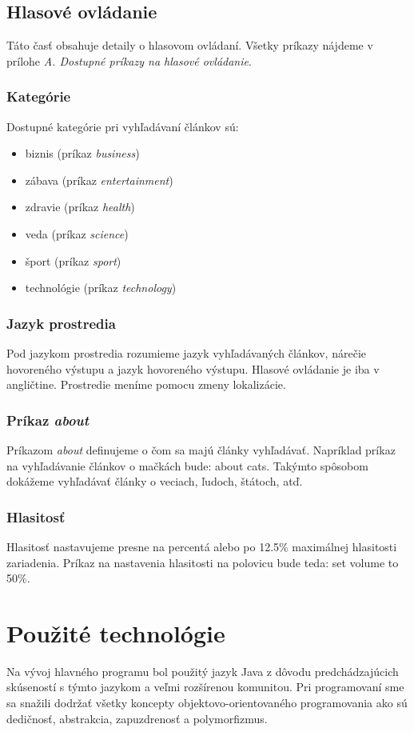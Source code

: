 \documentclass{template/socthesis}
\begin{document}
\subsection*{Hlasové ovládanie}
Táto časť obsahuje detaily o hlasovom ovládaní. Všetky príkazy nájdeme v prílohe \textit{A. Dostupné príkazy na hlasové ovládanie}.

\subsubsection{Kategórie}
Dostupné kategórie pri vyhľadávaní článkov sú:
\begin{itemize}
	\item biznis (príkaz \textit{business})
	\item zábava (príkaz \textit{entertainment})
	\item zdravie (príkaz \textit{health})
	\item veda (príkaz \textit{science})
	\item šport (príkaz \textit{sport})
	\item technológie (príkaz \textit{technology}) 
\end{itemize}

\subsubsection{Jazyk prostredia}
Pod jazykom prostredia rozumieme jazyk vyhľadávaných článkov, nárečie hovoreného výstupu a jazyk hovoreného výstupu. Hlasové ovládanie je iba v angličtine. Prostredie meníme pomocu zmeny lokalizácie.

\subsubsection{Príkaz \textit{about}}
Príkazom \textit{about} definujeme o čom sa majú články vyhľadávať. Napríklad príkaz na vyhľadávanie článkov o mačkách bude: about cats. Takýmto spôsobom dokážeme vyhľadávať články o veciach, ľudoch, štátoch, atď.

\subsubsection{Hlasitosť}
Hlasitosť nastavujeme presne na percentá alebo po 12.5\% maximálnej hlasitosti zariadenia. Príkaz na nastavenia hlasitosti na polovicu bude teda: set volume to 50\%.

\section{Použité technológie}
Na vývoj hlavného programu bol použitý jazyk Java z dôvodu predchádzajúcich skúseností s týmto jazykom a veľmi rozšírenou komunitou. Pri programovaní sme sa snažili dodržať všetky koncepty objektovo-orientovaného programovania ako sú dedičnosť, abstrakcia, zapuzdrenosť a polymorfizmus. \\
\end{document}

